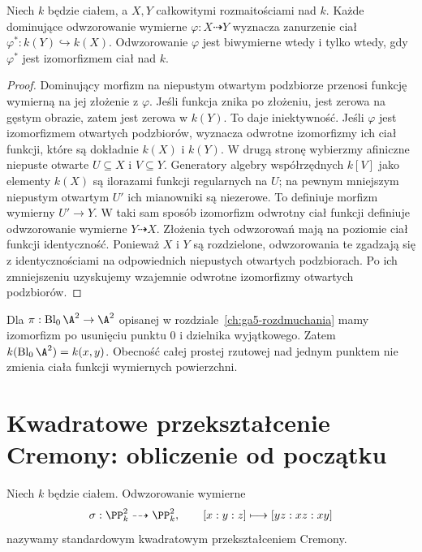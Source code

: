 \begin{twierdzenie}
\label{tw:ga8-function-fields}
Niech $k$ będzie ciałem, a $X,Y$ całkowitymi rozmaitościami
nad $k$. Każde dominujące odwzorowanie wymierne
$\varphi:X\dashrightarrow Y$ wyznacza zanurzenie ciał
$\varphi^*:k(Y)\hookrightarrow k(X)$.
Odwzorowanie $\varphi$ jest biwymierne wtedy i tylko
wtedy, gdy $\varphi^*$ jest izomorfizmem ciał nad $k$.
\end{twierdzenie}
\begin{proof}
Dominujący morfizm na niepustym otwartym podzbiorze
przenosi funkcję wymierną na jej złożenie z $\varphi$.
Jeśli funkcja znika po złożeniu, jest zerowa na gęstym
obrazie, zatem jest zerowa w $k(Y)$. To daje iniektywność.
Jeśli $\varphi$ jest izomorfizmem otwartych podzbiorów,
wyznacza odwrotne izomorfizmy ich ciał funkcji, które
są dokładnie $k(X)$ i $k(Y)$.
W drugą stronę wybierzmy afiniczne niepuste otwarte
$U\subseteq X$ i $V\subseteq Y$. Generatory algebry
współrzędnych $k[V]$ jako elementy $k(X)$ są ilorazami
funkcji regularnych na $U$; na pewnym mniejszym
niepustym otwartym $U'$ ich mianowniki są niezerowe.
To definiuje morfizm wymierny $U'\to Y$.
W taki sam sposób izomorfizm odwrotny ciał funkcji
definiuje odwzorowanie wymierne $Y\dashrightarrow X$.
Złożenia tych odwzorowań mają na poziomie ciał funkcji
identyczność. Ponieważ $X$ i $Y$ są rozdzielone,
odwzorowania te zgadzają się z identycznościami na
odpowiednich niepustych otwartych podzbiorach.
Po ich zmniejszeniu uzyskujemy wzajemnie odwrotne
izomorfizmy otwartych podzbiorów.
\end{proof}

\begin{przyklad}
Dla $\pi:\operatorname{Bl}_0\A^2\to\A^2$ opisanej
w rozdziale~\ref{ch:ga5-rozdmuchania} mamy izomorfizm
po usunięciu punktu $0$ i dzielnika wyjątkowego.
Zatem $k(\operatorname{Bl}_0\A^2)=k(x,y)$.
Obecność całej prostej rzutowej nad jednym punktem
nie zmienia ciała funkcji wymiernych powierzchni.
\end{przyklad}

\section{Kwadratowe przekształcenie Cremony: obliczenie od początku}
\label{sec:ga8-cremona}

\begin{definicja}
\label{def:ga8-cremona}
Niech $k$ będzie ciałem. Odwzorowanie wymierne
\[
\sigma:\PP^2_k\dashrightarrow\PP^2_k,\qquad
[x:y:z]\longmapsto[yz:xz:xy]
\]
nazywamy standardowym kwadratowym przekształceniem Cremony.
\end{definicja}

